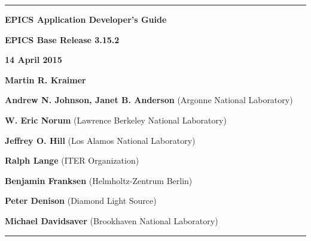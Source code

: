 \hrule

\vspace{1in}

\noindent \Huge \textbf{EPICS Application Developer's Guide}

\vspace{0.5in}

\noindent \Large \textbf{EPICS Base Release 3.15.2}

\noindent \textbf{14 April 2015}

\vspace{0.5in}

\normalsize
\noindent \textbf{Martin R. Kraimer}

\noindent \textbf{Andrew N. Johnson, Janet B. Anderson} (Argonne National Laboratory)

\noindent \textbf{W. Eric Norum} (Lawrence Berkeley National Laboratory)

\noindent \textbf{Jeffrey O. Hill} (Los Alamos National Laboratory)

\noindent \textbf{Ralph Lange} (ITER Organization)

\noindent \textbf{Benjamin Franksen} (Helmholtz-Zentrum Berlin)

\noindent \textbf{Peter Denison} (Diamond Light Source)

\noindent \textbf{Michael Davidsaver} (Brookhaven National Laboratory)

\vspace{1in}
\hrule
